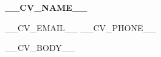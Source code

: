 \documentclass[11pt, a4paper]{article}
\begin{document}
{\centering
  {\LARGE\bfseries __CV_NAME__}\par
  \vspace{3pt}
  {\small __CV_EMAIL__ \quad\textbullet\quad __CV_PHONE__}\par
  \vspace{4pt}
  \textcolor{cvblue}{\titlerule[1pt]}\par
  \vspace{6pt}
}

__CV_BODY__
\end{document}
